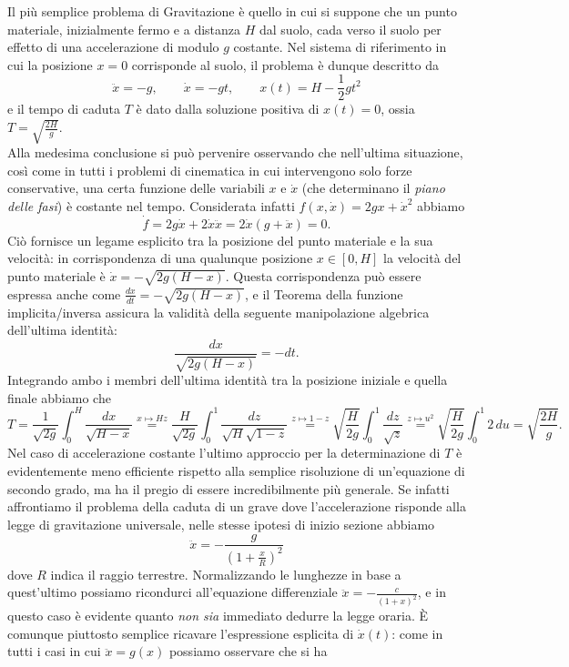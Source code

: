 \documentclass[a4paper,twoside]{article}
\theoremstyle{definition}
\numberwithin{theorem}{section}
\begin{document}
Il più semplice problema di Gravitazione è quello in cui si suppone che un punto materiale, inizialmente fermo e a distanza $H$ dal suolo, cada verso il suolo per effetto di una accelerazione di modulo $g$ costante. Nel sistema di riferimento in cui la posizione $x=0$ corrisponde al suolo, il problema è dunque descritto da 
$$ \ddot{x}=-g,\qquad \dot x = -gt,\qquad x(t) = H-\frac{1}{2}gt^2 $$
e il tempo di caduta $T$ è dato dalla soluzione positiva di $x(t)=0$, ossia $T=\sqrt{\frac{2H}{g}}$.\\
Alla medesima conclusione si può pervenire osservando che nell'ultima situazione, così come in tutti i problemi di cinematica in cui intervengono solo forze conservative, una certa funzione delle variabili $x$ e $\dot{x}$ (che determinano il \emph{piano delle fasi}) è costante nel tempo. Considerata infatti $f(x,\dot{x})=2g x+\dot{x}^2$ abbiamo 
$$ \dot{f} = 2g\dot{x} + 2\dot{x}\ddot{x} = 2\dot{x}(g+\ddot{x}) = 0. $$
Ciò fornisce un legame esplicito tra la posizione del punto materiale e la sua velocità: in corrispondenza di una qualunque posizione $x\in[0,H]$ la velocità del punto materiale è $\dot{x}=-\sqrt{2g(H-x)}$. Questa corrispondenza può essere espressa anche come $\frac{dx}{dt}=-\sqrt{2g(H-x)}$, e il Teorema della funzione implicita/inversa assicura la validità della seguente manipolazione algebrica dell'ultima identità:
$$ \frac{dx}{\sqrt{2g(H-x)}} = -dt. $$
Integrando ambo i membri dell'ultima identità tra la posizione iniziale e quella finale abbiamo che 
$$ T = \frac{1}{\sqrt{2g}}\int_{0}^{H}\frac{dx}{\sqrt{H-x}}\stackrel{x\mapsto Hz}{=}\frac{H}{\sqrt{2g}}\int_{0}^{1}\frac{dz}{\sqrt{H}\sqrt{1-z}}\stackrel{z\mapsto 1-z}{=}\sqrt{\frac{H}{2g}}\int_{0}^{1}\frac{dz}{\sqrt{z}}\stackrel{z\mapsto u^2}{=}\sqrt{\frac{H}{2g}}\int_{0}^{1}2\,du = \sqrt{\frac{2H}{g}}. $$
Nel caso di accelerazione costante l'ultimo approccio per la determinazione di $T$ è evidentemente meno efficiente rispetto alla semplice risoluzione di un'equazione di secondo grado, ma ha il pregio di essere incredibilmente più generale. Se infatti affrontiamo il problema della caduta di un grave dove l'accelerazione risponde alla legge di gravitazione universale, nelle stesse ipotesi di inizio sezione abbiamo 
$$ \ddot{x} = -\frac{g}{\left(1+\frac{x}{R}\right)^2} $$
dove $R$ indica il raggio terrestre. Normalizzando le lunghezze in base a quest'ultimo possiamo ricondurci all'equazione differenziale $\ddot{x} = -\frac{c}{(1+x)^2}$, e in questo caso è evidente quanto \emph{non sia} immediato dedurre la legge oraria. È comunque piuttosto semplice ricavare l'espressione esplicita di $\dot{x}(t)$: come in tutti i casi in cui $\ddot{x}=g(x)$ possiamo osservare che si ha
\end{document}
